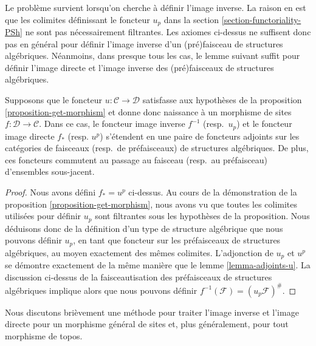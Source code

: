 \noindent
Le problème survient lorsqu'on cherche à définir l'image inverse.
La raison en est que les colimites définissant
le foncteur $u_p$ dans la section \ref{section-functoriality-PSh}
ne sont pas nécessairement filtrantes. Les axiomes ci-dessus ne suffisent donc pas
en général pour définir l'image inverse d'un (pré)faisceau de structures
algébriques. Néanmoins, dans presque tous les cas, le lemme
suivant suffit pour définir l'image directe et l'image inverse
des (pré)faisceaux de structures algébriques.

\begin{lemma}
\label{lemma-push-pull-good-case}
Supposons que le foncteur $u : \mathcal{C} \to \mathcal{D}$ satisfasse
aux hypothèses de la proposition \ref{proposition-get-morphism}
et donne donc naissance à un morphisme de sites
$f : \mathcal{D} \to \mathcal{C}$. Dans ce cas,
le foncteur image inverse $f^{-1}$ (resp.\ $u_p$) et le foncteur image directe
$f_*$ (resp. $u^p$) s'étendent en une paire de foncteurs adjoints sur
les catégories de faisceaux (resp.\ de préfaisceaux) de structures algébriques.
De plus, ces foncteurs commutent au passage au
faisceau (resp.\ au préfaisceau) d'ensembles sous-jacent.
\end{lemma}

\begin{proof}
Nous avons défini $f_* = u^p$ ci-dessus.
Au cours de la démonstration de la proposition \ref{proposition-get-morphism},
nous avons vu que toutes les colimites utilisées pour définir $u_p$ sont
filtrantes sous les hypothèses de la proposition.
Nous déduisons donc de la définition d'un type de
structure algébrique que nous pouvons définir $u_p$, en tant que foncteur sur
les préfaisceaux de structures algébriques, au moyen exactement des mêmes colimites.
L'adjonction de $u_p$ et $u^p$ se démontre exactement de la
même manière que le lemme \ref{lemma-adjoints-u}.
La discussion ci-dessus de la faisceautisation des préfaisceaux de
structures algébriques implique alors que nous pouvons définir
$f^{-1}(\mathcal{F}) = (u_p\mathcal{F})^\#$.
\end{proof}

\noindent
Nous discutons brièvement une méthode pour traiter l'image inverse et
l'image directe pour un morphisme général de sites et, plus généralement,
pour tout morphisme de topos.

